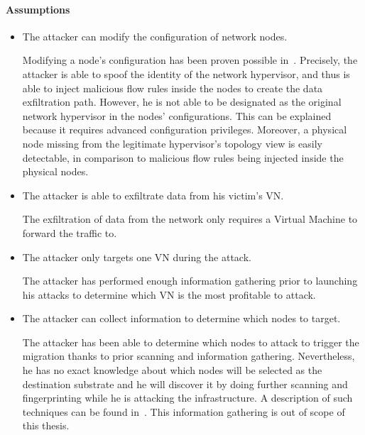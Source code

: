 \paragraph{Assumptions}
\begin{itemize}
    \item The attacker can modify the configuration of network nodes.
    
    Modifying a node's configuration has been proven  possible in~\cite{Taxonomy_Hizver2015, Bokani2015, attain-Ujcich2017}. Precisely, the attacker is able to spoof the identity of the network hypervisor, and thus is able to inject malicious flow rules inside the nodes to create the data exfiltration path. 
    However, he is not able to be designated as the original network hypervisor in the nodes' configurations. 
    This can be explained because it requires advanced configuration privileges. Moreover, a physical node missing from the legitimate hypervisor's topology view is easily detectable, in comparison to malicious flow rules being injected inside the physical nodes.
    
    \item The attacker is able to exfiltrate data from his victim's VN.
    
    The exfiltration of data from the network only requires a Virtual Machine to forward the traffic to.
    
    \item The attacker only targets one VN during the attack. 
    
     The attacker has performed enough information gathering prior to launching his attacks  to determine which VN is the most profitable to attack.
     
    
    \item The attacker can collect information to determine which nodes to target.
    
    The attacker has been able to determine which nodes to attack to trigger the migration thanks to prior scanning and information gathering. 
    Nevertheless, he has no exact knowledge about which nodes will be selected as the destination substrate and he will discover it by doing further scanning and fingerprinting  while he is attacking the infrastructure.  
    A description of such techniques can be found in~\cite{Hong2015,Sphinx-Dhawan2015}.
    This information gathering is out of scope of this thesis.
    

\end{itemize}
